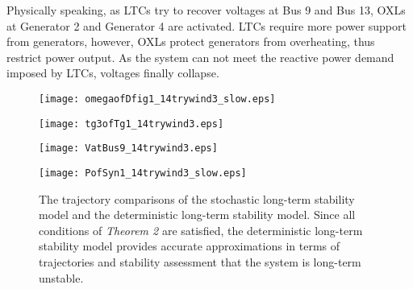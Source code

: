 \documentclass[journal]{IEEEtran}
\begin{document}
Physically speaking, as LTCs try to recover voltages at Bus 9 and Bus 13, OXLs at Generator 2 and Generator 4 are activated. LTCs require more power support from generators, however, OXLs protect generators from overheating, thus restrict power output. As the system can not meet the reactive power demand imposed by LTCs, voltages finally collapse.

\begin{figure}[!ht]
\centering
\begin{minipage}[t]{0.5\linewidth}
\texttt{[image: omegaofDfig1\_14trywind3\_slow.eps]}
\end{minipage}\begin{minipage}[t]{0.5\linewidth}
\texttt{[image: tg3ofTg1\_14trywind3.eps]}
\end{minipage}
\begin{minipage}[t]{0.5\linewidth}
\texttt{[image: VatBus9\_14trywind3.eps]}
\end{minipage}\begin{minipage}[t]{0.5\linewidth}
\texttt{[image: PofSyn1\_14trywind3\_slow.eps]}
\end{minipage}
\caption{The trajectory comparisons of the stochastic long-term stability model and the deterministic long-term stability model. Since all conditions of \textit{Theorem 2} are satisfied, the deterministic long-term stability model provides accurate approximations in terms of trajectories and stability assessment that the system is long-term unstable.}\label{my14trywind3}
\end{figure}
\end{document}
